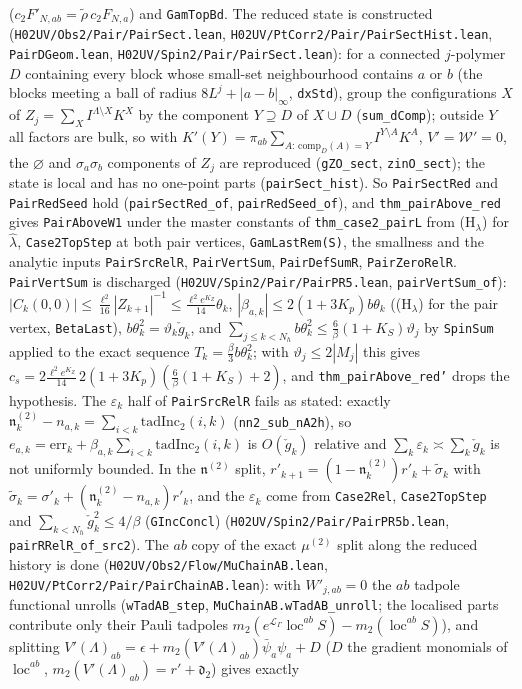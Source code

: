 \documentclass[11pt]{amsart}
\theoremstyle{definition}
\theoremstyle{remark}
\numberwithin{equation}{section}
\begin{document}
($c_2F'_{N,ab}=\tilde\rho\,c_2F_{N,a}$) and \texttt{GamTopBd}. The reduced state is constructed (\texttt{H02UV/Obs2/Pair/PairSect.lean}, \texttt{H02UV/PtCorr2/Pair/PairSectHist.lean}, \texttt{PairDGeom.lean}, \texttt{H02UV/Spin2/Pair/PairSect.lean}): for a connected $j$-polymer $D$ containing every block whose small-set neighbourhood contains $a$ or $b$ (the blocks meeting a ball of radius $8L^{j}+|a-b|_\infty$, \texttt{dxStd}), group the configurations $X$ of $Z_j=\sum_X I^{\Lambda\setminus X}K^X$ by the component $Y\supseteq D$ of $X\cup D$ (\texttt{sum\_dComp}); outside $Y$ all factors are bulk, so with $K'(Y)=\pi_{ab}\sum_{A:\,\mathrm{comp}_D(A)=Y}I^{Y\setminus A}K^A$, $V'=\mathcal W'=0$, the $\varnothing$ and $\sigma_a\sigma_b$ components of $Z_j$ are reproduced (\texttt{gZO\_sect}, \texttt{zinO\_sect}); the state is local and has no one-point parts (\texttt{pairSect\_hist}). So \texttt{PairSectRed} and \texttt{PairRedSeed} hold (\texttt{pairSectRed\_of}, \texttt{pairRedSeed\_of}), and \texttt{thm\_pairAbove\_red} gives \texttt{PairAboveW1} under the master constants of \texttt{thm\_case2\_pairL} from (H$_\lambda$) for $\hat\lambda$, \texttt{Case2TopStep} at both pair vertices, \texttt{GamLastRem(S)}, the smallness and the analytic inputs \texttt{PairSrcRelR}, \texttt{PairVertSum}, \texttt{PairDefSumR}, \texttt{PairZeroRelR}. \texttt{PairVertSum} is discharged (\texttt{H02UV/Spin2/Pair/PairPR5.lean}, \texttt{pairVertSum\_of}): $|C_k(0,0)|\le\frac{\ell^2}{16}|Z_{k+1}|^{-1}\le\frac{\ell^2e^{K_Z}}{14}\theta_k$, $|\beta_{a,k}|\le 2(1+3K_p)b\theta_k$ ((H$_\lambda$) for the pair vertex, \texttt{BetaLast}), $b\theta_k^2=\vartheta_k\check g_k$, and $\sum_{j\le k<N_h}b\theta_k^2\le\frac6\beta(1+K_S)\vartheta_j$ by \texttt{SpinSum} applied to the exact sequence $T_k=\frac\beta3b\theta_k^2$; with $\vartheta_j\le2|M_j|$ this gives $c_s=2\frac{\ell^2e^{K_Z}}{14}\,2(1+3K_p)(\frac6\beta(1+K_S)+2)$, and \texttt{thm\_pairAbove\_red'} drops the hypothesis. The $\varepsilon_k$ half of \texttt{PairSrcRelR} fails as stated: exactly $\mathfrak n^{(2)}_k-n_{a,k}=\sum_{i<k}\mathrm{tadInc}_2(i,k)$ (\texttt{nn2\_sub\_nA2h}), so $e_{a,k}=\mathrm{err}_k+\beta_{a,k}\sum_{i<k}\mathrm{tadInc}_2(i,k)$ is $O(\check g_k)$ relative and $\sum_k\varepsilon_k\asymp\sum_k\check g_k$ is not uniformly bounded. In the $\mathfrak n^{(2)}$ split, $r'_{k+1}=(1-\mathfrak n^{(2)}_k)r'_k+\tilde\sigma_k$ with $\tilde\sigma_k=\sigma'_k+(\mathfrak n^{(2)}_k-n_{a,k})r'_k$, and the $\varepsilon_k$ come from \texttt{Case2Rel}, \texttt{Case2TopStep} and $\sum_{k<N_h}\check g_k^2\le4/\beta$ (\texttt{GIncConcl}) (\texttt{H02UV/Spin2/Pair/PairPR5b.lean}, \texttt{pairRRelR\_of\_src2}). The $ab$ copy of the exact $\mu^{(2)}$ split along the reduced history is done (\texttt{H02UV/Obs2/Flow/MuChainAB.lean}, \texttt{H02UV/PtCorr2/Pair/PairChainAB.lean}): with $W'_{j,ab}=0$ the $ab$ tadpole functional unrolls (\texttt{wTadAB\_step}, \texttt{MuChainAB.wTadAB\_unroll}; the localised parts contribute only their Pauli tadpoles $m_2(e^{\mathcal L_\Gamma}\operatorname{loc}^{ab}S)-m_2(\operatorname{loc}^{ab}S)$), and splitting $V'(\Lambda)_{ab}=\epsilon+m_2(V'(\Lambda)_{ab})\bar\psi_a\psi_a+D$ ($D$ the gradient monomials of $\operatorname{loc}^{ab}$, $m_2(V'(\Lambda)_{ab})=r'+\mathfrak d_2$) gives exactly 
\end{document}
